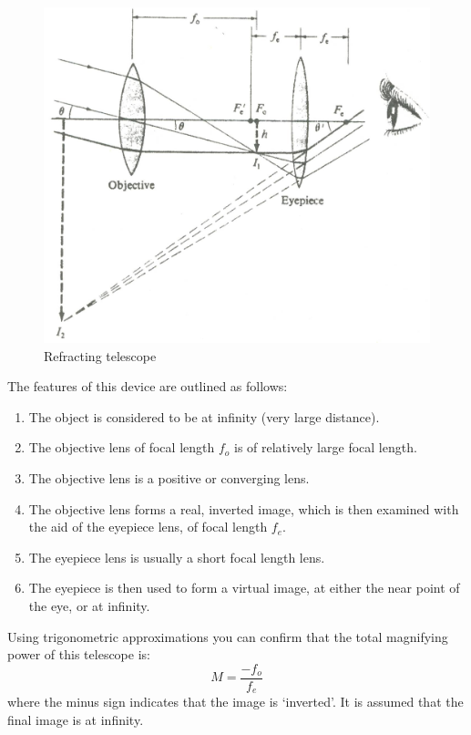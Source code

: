 \begin{figure}[htb] %
  \centering
  \includegraphics[scale=0.7]{5bgraf/tscope}
  \caption{Refracting telescope}
  \label{f:tscope}
\end{figure} %

The features of this device are outlined as follows:
\begin{enumerate}
	\item The object is considered to be at infinity (very large distance). 
	\item The objective lens of focal length $f_o$ is of relatively large focal length.	
	\item The objective lens is a positive or converging lens.
	\item The objective lens forms a real, inverted image, which is then examined with the aid of the eyepiece lens, of focal length $f_e$. 
	\item The eyepiece lens is usually a short focal length lens.
	\item The eyepiece is then used to form a virtual image, at either the near point of the eye, or at infinity.
\end{enumerate}

Using trigonometric approximations you can confirm that the total magnifying power of this telescope is:
\begin{equation}\label{e:tscope}
	M = \frac{-f_o}{f_e}
\end{equation}
where the minus sign indicates that the image is `inverted'. It is assumed that the final image is at infinity.

